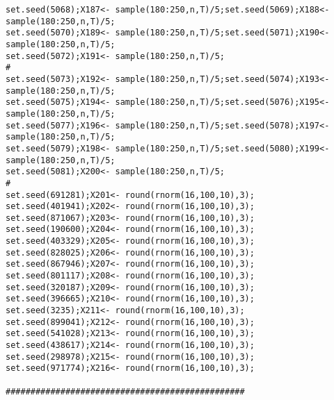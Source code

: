 \documentclass[]{article}
\begin{document}
\begin{verbatim}
set.seed(5068);X187<- sample(180:250,n,T)/5;set.seed(5069);X188<- sample(180:250,n,T)/5;
set.seed(5070);X189<- sample(180:250,n,T)/5;set.seed(5071);X190<- sample(180:250,n,T)/5;
set.seed(5072);X191<- sample(180:250,n,T)/5;
#
set.seed(5073);X192<- sample(180:250,n,T)/5;set.seed(5074);X193<- sample(180:250,n,T)/5;
set.seed(5075);X194<- sample(180:250,n,T)/5;set.seed(5076);X195<- sample(180:250,n,T)/5;
set.seed(5077);X196<- sample(180:250,n,T)/5;set.seed(5078);X197<- sample(180:250,n,T)/5;
set.seed(5079);X198<- sample(180:250,n,T)/5;set.seed(5080);X199<- sample(180:250,n,T)/5;
set.seed(5081);X200<- sample(180:250,n,T)/5;
#
set.seed(691281);X201<- round(rnorm(16,100,10),3);
set.seed(401941);X202<- round(rnorm(16,100,10),3);
set.seed(871067);X203<- round(rnorm(16,100,10),3);
set.seed(190600);X204<- round(rnorm(16,100,10),3);
set.seed(403329);X205<- round(rnorm(16,100,10),3);
set.seed(828025);X206<- round(rnorm(16,100,10),3);
set.seed(867946);X207<- round(rnorm(16,100,10),3);
set.seed(801117);X208<- round(rnorm(16,100,10),3);
set.seed(320187);X209<- round(rnorm(16,100,10),3);
set.seed(396665);X210<- round(rnorm(16,100,10),3);
set.seed(3235);X211<- round(rnorm(16,100,10),3);
set.seed(899041);X212<- round(rnorm(16,100,10),3);
set.seed(541028);X213<- round(rnorm(16,100,10),3);
set.seed(438617);X214<- round(rnorm(16,100,10),3);
set.seed(298978);X215<- round(rnorm(16,100,10),3);
set.seed(971774);X216<- round(rnorm(16,100,10),3);

################################################


\end{verbatim}
\end{document}
